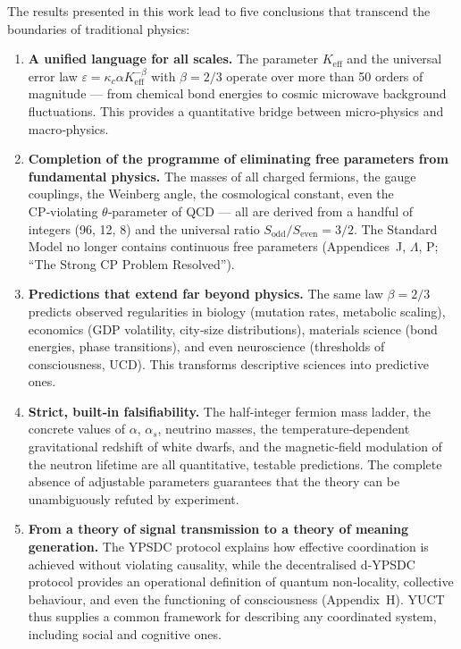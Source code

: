 \documentclass[11pt,a4paper]{article}
\begin{document}
	The results presented in this work lead to five conclusions that transcend the boundaries of
	traditional physics:
	
	\begin{enumerate}
		\item \textbf{A unified language for all scales.}
		The parameter \(K_{\mathrm{eff}}\) and the universal error law
		\(\varepsilon = \kappa_c \alpha K_{\mathrm{eff}}^{-\beta}\) with \(\beta = 2/3\) operate over
		more than 50 orders of magnitude --- from chemical bond energies to cosmic microwave
		background fluctuations.  This provides a quantitative bridge between micro‑physics and
		macro‑physics.
		
		\item \textbf{Completion of the programme of eliminating free parameters from fundamental
			physics.}
		The masses of all charged fermions, the gauge couplings, the Weinberg angle, the
		cosmological constant, even the CP‑violating \(\theta\)‑parameter of QCD --- all are
		derived from a handful of integers (96, 12, 8) and the universal ratio
		\(S_{\mathrm{odd}}/S_{\mathrm{even}} = 3/2\).  The Standard Model no longer contains
		continuous free parameters (Appendices~J, \(\Lambda\), P; ``The Strong CP Problem
		Resolved'').
		
		\item \textbf{Predictions that extend far beyond physics.}
		The same law \(\beta = 2/3\) predicts observed regularities in biology (mutation rates,
		metabolic scaling), economics (GDP volatility, city‑size distributions), materials science
		(bond energies, phase transitions), and even neuroscience (thresholds of consciousness,
		UCD).  This transforms descriptive sciences into predictive ones.
		
		\item \textbf{Strict, built‑in falsifiability.}
		The half‑integer fermion mass ladder, the concrete values of \(\alpha\), \(\alpha_s\),
		neutrino masses, the temperature‑dependent gravitational redshift of white dwarfs, and the
		magnetic‑field modulation of the neutron lifetime are all quantitative, testable
		predictions.  The complete absence of adjustable parameters guarantees that the theory can
		be unambiguously refuted by experiment.
		
		\item \textbf{From a theory of signal transmission to a theory of meaning generation.}
		The YPSDC protocol explains how effective coordination is achieved without violating
		causality, while the decentralised d‑YPSDC protocol provides an operational definition of
		quantum non‑locality, collective behaviour, and even the functioning of consciousness
		(Appendix~H).  YUCT thus supplies a common framework for describing any coordinated
		system, including social and cognitive ones.
	\end{enumerate}
	
\end{document}
